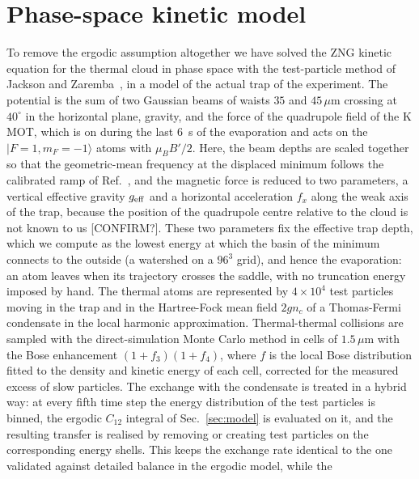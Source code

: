 \section{Phase-space kinetic model}
\label{sec:phasespace}
To remove the ergodic assumption altogether we have solved the ZNG kinetic
equation for the thermal cloud in phase space with the test-particle method of
Jackson and Zaremba~\cite{Jackson2002}, in a model of the actual trap of the
experiment. The potential is the sum of two Gaussian beams of waists $35$ and
$45\,\mu$m crossing at $40^\circ$ in the horizontal plane, gravity, and the
force of the quadrupole field of the K MOT, which is on during the last $6$~s
of the evaporation and acts on the $|F=1,m_F=-1\rangle$ atoms with
$\mu_B B'/2$. Here, the beam depths are scaled together so that the
geometric-mean frequency at the displaced minimum follows the calibrated ramp
of Ref.~\cite{MelladoMunoz2020}, and the magnetic force is reduced to two
parameters, a vertical effective gravity $g_{\rm eff}$ and a horizontal
acceleration $f_x$ along the weak axis of the trap, because the position of
the quadrupole centre relative to the cloud is not known to us
[CONFIRM?]. These two parameters fix the effective trap depth, which we
compute as the lowest energy at which the basin of the minimum connects to
the outside (a watershed on a $96^3$ grid), and hence the evaporation:
an atom leaves when its trajectory crosses the saddle, with no truncation
energy imposed by hand. The thermal atoms are represented by $4\times10^4$
test particles moving in the trap and in the Hartree-Fock mean field $2gn_c$
of a Thomas-Fermi condensate in the local harmonic approximation.
Thermal-thermal collisions are sampled with the direct-simulation Monte Carlo
method in cells of $1.5\,\mu$m with the Bose enhancement $(1+f_3)(1+f_4)$,
where $f$ is the local Bose distribution fitted to the density and kinetic
energy of each cell, corrected for the measured excess of slow particles.
The exchange with the condensate is treated in a hybrid way: at every fifth
time step the energy distribution of the test particles is binned, the
ergodic $C_{12}$ integral of Sec.~\ref{sec:model} is evaluated on it, and the
resulting transfer is realised by removing or creating test particles on the
corresponding energy shells. This keeps the exchange rate identical to the
one validated against detailed balance in the ergodic model, while the
